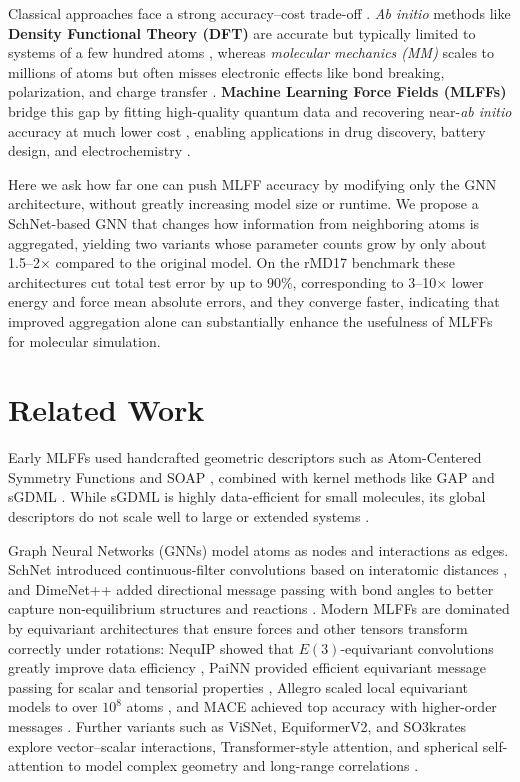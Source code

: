 \documentclass[sigconf, nonacm]{acmart}
\begin{document}
Classical approaches face a strong accuracy–cost trade-off \cite{frank2022so3krates}. \textit{Ab initio} methods like \textbf{Density Functional Theory (DFT)} are accurate but typically limited to systems of a few hundred atoms \cite{MlffAlex}, whereas \textit{molecular mechanics (MM)} scales to millions of atoms but often misses electronic effects like bond breaking, polarization, and charge transfer \cite{CUI2025103191, MlffAlex}. \textbf{Machine Learning Force Fields (MLFFs)} bridge this gap by fitting high-quality quantum data and recovering near-\textit{ab initio} accuracy at much lower cost \cite{CUI2025103191, MlffAlex, batatia2022mace}, enabling applications in drug discovery, battery design, and electrochemistry \cite{ElecChem, CUI2025103191}. 

Here we ask how far one can push MLFF accuracy by modifying only the GNN architecture, without greatly increasing model size or runtime. We propose a SchNet-based GNN that changes how information from neighboring atoms is aggregated, yielding two variants whose parameter counts grow by only about 1.5–2× compared to the original model. On the rMD17 benchmark these architectures cut total test error by up to 90\%, corresponding to 3–10× lower energy and force mean absolute errors, and they converge faster, indicating that improved aggregation alone can substantially enhance the usefulness of MLFFs for molecular simulation.

\section{Related Work}

Early MLFFs used handcrafted geometric descriptors such as Atom-Centered Symmetry Functions and SOAP \cite{MlffAlex, batatia2022mace}, combined with kernel methods like GAP and sGDML \cite{MlffAlex, Chmiela2018, CHMIELA201938}. While sGDML is highly data-efficient for small molecules, its global descriptors do not scale well to large or extended systems \cite{MlffAlex}. 

Graph Neural Networks (GNNs) model atoms as nodes and interactions as edges. SchNet introduced continuous-filter convolutions based on interatomic distances \cite{10.1063/1.5019779}, and DimeNet++ added directional message passing with bond angles to better capture non-equilibrium structures and reactions \cite{gasteiger2020dimenetpp}. Modern MLFFs are dominated by equivariant architectures that ensure forces and other tensors transform correctly under rotations: NequIP showed that $E(3)$-equivariant convolutions greatly improve data efficiency \cite{Batzner2022}, PaiNN provided efficient equivariant message passing for scalar and tensorial properties \cite{Schtt2021EquivariantMP}, Allegro scaled local equivariant models to over $10^8$ atoms \cite{Musaelian2023}, and MACE achieved top accuracy with higher-order messages \cite{batatia2022mace}. Further variants such as ViSNet, Equi\-formerV2, and SO3krates explore vector–scalar interactions, Trans\-former-style attention, and spherical self-attention to model complex geometry and long-range correlations \cite{Wang2024, liao2024equiformerv2, frank2022so3krates}. 
\end{document}
